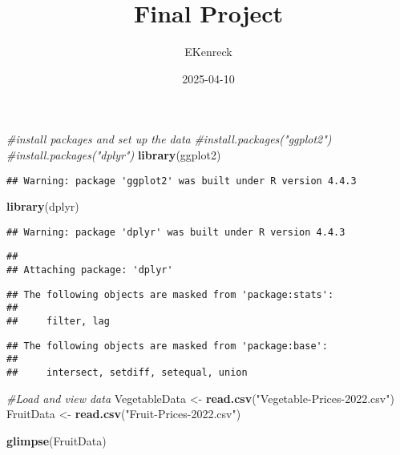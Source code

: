 \documentclass[
]{article}
\title{Final Project}
\author{EKenreck}
\date{2025-04-10}
\newenvironment{Shaded}{\begin{snugshade}}{\end{snugshade}}
\newcommand{\CommentTok}[1]{\textcolor[rgb]{0.56,0.35,0.01}{\textit{#1}}}
\newcommand{\FunctionTok}[1]{\textcolor[rgb]{0.13,0.29,0.53}{\textbf{#1}}}
\newcommand{\NormalTok}[1]{#1}
\newcommand{\OtherTok}[1]{\textcolor[rgb]{0.56,0.35,0.01}{#1}}
\newcommand{\StringTok}[1]{\textcolor[rgb]{0.31,0.60,0.02}{#1}}
\begin{document}
\maketitle

\begin{Shaded}
\begin{Highlighting}[]
\CommentTok{\#install packages and set up the data}
\CommentTok{\#install.packages("ggplot2")}
\CommentTok{\#install.packages("dplyr")}
\FunctionTok{library}\NormalTok{(ggplot2)}
\end{Highlighting}
\end{Shaded}

\begin{verbatim}
## Warning: package 'ggplot2' was built under R version 4.4.3
\end{verbatim}

\begin{Shaded}
\begin{Highlighting}[]
\FunctionTok{library}\NormalTok{(dplyr)}
\end{Highlighting}
\end{Shaded}

\begin{verbatim}
## Warning: package 'dplyr' was built under R version 4.4.3
\end{verbatim}

\begin{verbatim}
## 
## Attaching package: 'dplyr'
\end{verbatim}

\begin{verbatim}
## The following objects are masked from 'package:stats':
## 
##     filter, lag
\end{verbatim}

\begin{verbatim}
## The following objects are masked from 'package:base':
## 
##     intersect, setdiff, setequal, union
\end{verbatim}

\begin{Shaded}
\begin{Highlighting}[]
\CommentTok{\#Load and view data}
\NormalTok{VegetableData }\OtherTok{\textless{}{-}} \FunctionTok{read.csv}\NormalTok{(}\StringTok{"Vegetable{-}Prices{-}2022.csv"}\NormalTok{)}
\NormalTok{FruitData }\OtherTok{\textless{}{-}} \FunctionTok{read.csv}\NormalTok{(}\StringTok{"Fruit{-}Prices{-}2022.csv"}\NormalTok{)}

\FunctionTok{glimpse}\NormalTok{(FruitData)}
\end{Highlighting}
\end{Shaded}
\end{document}
